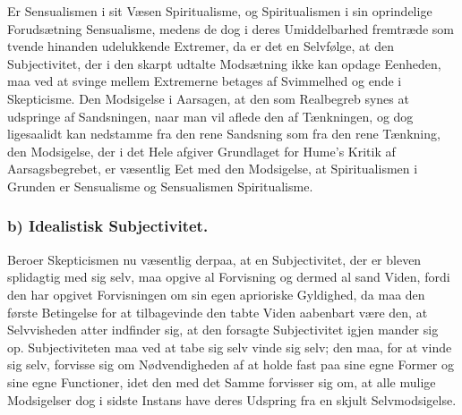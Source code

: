 \documentclass[11pt]{book}
\newcommand{\opage}[1]{\marginnote{\footnotesize\textit{[#1]}}}
\begin{document}
Er Sensualismen i sit Væsen Spiritualisme, og Spiritualismen i sin
oprindelige Forudsætning Sensualisme, medens de dog i deres
Umiddelbarhed fremtræde som tvende hinanden udelukkende Extremer, da
er det en Selvfølge, at den Subjectivitet, der i den skarpt udtalte
Modsætning ikke kan opdage Eenheden, maa ved at svinge mellem
Extremerne betages af Svimmelhed og ende i Skepticisme. Den Modsigelse
i Aarsagen, at den som Realbegreb synes at udspringe af Sandsningen,
naar man vil aflede den af Tænkningen, og dog ligesaalidt kan
nedstamme fra den rene Sandsning som fra den rene Tænkning, den
Modsigelse, der i det Hele afgiver Grundlaget for Hume's Kritik af
Aarsagsbegrebet, er væsentlig Eet med den Modsigelse, at
Spiritualismen i Grunden er Sensualisme og Sensualismen
Spiritualisme.

\subsubsection*{b) Idealistisk Subjectivitet.}

Beroer Skepticismen nu væsentlig derpaa, at en Subjectivitet, der er
bleven splidagtig med sig selv, maa opgive al Forvisning og dermed al
sand Viden, fordi den har opgivet Forvisningen om sin egen aprioriske
Gyldighed, da maa
\opage{30} \setcounter{footnote}{0}%
den første Betingelse for at tilbagevinde den tabte Viden aabenbart
være den, at Selvvisheden atter indfinder sig, at den forsagte
Subjectivitet igjen mander sig op. Subjectiviteten maa ved at tabe sig
selv vinde sig selv; den maa, for at vinde sig selv, forvisse sig om
Nødvendigheden af at holde fast paa sine egne Former og sine egne
Functioner, idet den med det Samme forvisser sig om, at alle mulige
Modsigelser dog i sidste Instans have deres Udspring fra en skjult
Selvmodsigelse.
\end{document}
